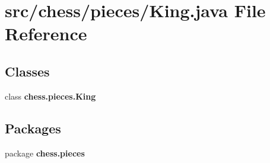 \section{src/chess/pieces/\+King.java File Reference}
\label{_king_8java}
\subsection*{Classes}
\begin{DoxyCompactItemize}
\item 
class {\bf chess.\+pieces.\+King}
\end{DoxyCompactItemize}
\subsection*{Packages}
\begin{DoxyCompactItemize}
\item 
package {\bf chess.\+pieces}
\end{DoxyCompactItemize}
